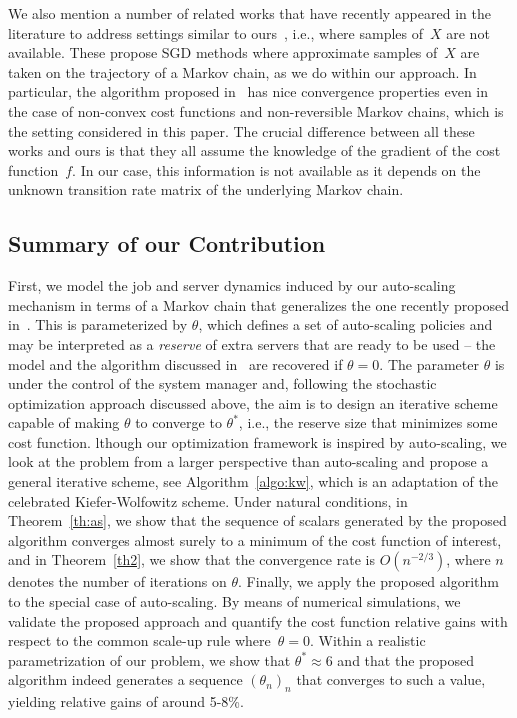 We also mention a number of related works that have recently appeared in the literature to address settings similar to ours~\cite{MCGD,M1,M2,M3,M4}, i.e., where samples of~$X$ are not available.
These propose SGD methods where approximate samples of~$X$ are taken on the trajectory of a Markov chain, as we do within our approach.
In particular, the algorithm proposed in~\cite{MCGD} has nice convergence properties even in the case of non-convex cost functions and non-reversible Markov chains, which is the setting considered in this paper. The crucial difference between all these works and ours is that they all assume the knowledge of the gradient of the cost function~$f$.
In our case, this information is not available as it depends on the unknown transition rate matrix of the underlying Markov chain.






\subsection{Summary of our Contribution}

First, we model the job and server dynamics induced by our auto-scaling mechanism in terms of a Markov chain that generalizes the one recently proposed in~\cite{scaleperrequest}.
This is parameterized by $\theta$, which defines a set of auto-scaling policies and may be interpreted as a \emph{reserve} of extra servers that are ready to be used --
the model and the algorithm discussed in~\cite{scaleperrequest} are recovered if $\theta=0$.
The parameter $\theta$ is under the control of the system manager and, following the stochastic optimization approach discussed above, the aim is to design an iterative scheme capable of making $\theta$ to converge to $\theta^*$, i.e., the reserve size that minimizes some cost function.
%
lthough our optimization framework is inspired by auto-scaling, we look at the problem from a larger perspective than auto-scaling and propose a general iterative scheme, see Algorithm~\ref{algo:kw}, which is an adaptation of the celebrated Kiefer-Wolfowitz scheme.
Under natural conditions, in Theorem~\ref{th:as}, we show that the sequence of scalars generated by the proposed algorithm converges almost surely to a minimum of the cost function of interest, and in Theorem~\ref{th2}, we show that the convergence rate is $O(n^{-2/3})$, where $n$ denotes the number of iterations on $\theta$.
%
Finally, we apply the proposed algorithm to the special case of auto-scaling. By means of numerical simulations, we validate the proposed approach and quantify the cost function relative gains with respect to the common scale-up rule where~$\theta=0$.
Within a realistic parametrization of our problem, we show that $\theta^* \approx 6$ and that the proposed algorithm indeed generates a sequence $(\theta_n)_n$ that converges to such a value, yielding relative gains of around 5-8\%.


